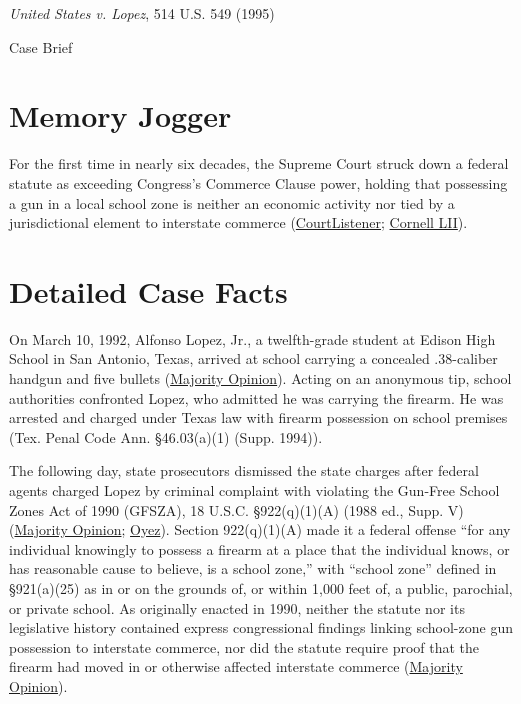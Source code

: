 \documentclass[12pt]{article}
\begin{document}
\begin{center}
{\LARGE \textit{United States v. Lopez}, 514 U.S. 549 (1995)\par}
\vspace{0.8em}
{\large Case Brief\par}
\end{center}
\vspace{1em}

\section{Memory Jogger}
For the first time in nearly six decades, the Supreme Court struck down a federal statute as exceeding Congress's Commerce Clause power, holding that possessing a gun in a local school zone is neither an economic activity nor tied by a jurisdictional element to interstate commerce (\href{https://www.courtlistener.com/opinion/117927/united-states-v-lopez/}{CourtListener}; \href{https://www.law.cornell.edu/supct/html/93-1260.ZO.html}{Cornell LII}).

\section{Detailed Case Facts}
On March 10, 1992, Alfonso Lopez, Jr., a twelfth-grade student at Edison High School in San Antonio, Texas, arrived at school carrying a concealed .38-caliber handgun and five bullets (\href{https://www.law.cornell.edu/supct/html/93-1260.ZO.html}{Majority Opinion}). Acting on an anonymous tip, school authorities confronted Lopez, who admitted he was carrying the firearm. He was arrested and charged under Texas law with firearm possession on school premises (Tex. Penal Code Ann. \S 46.03(a)(1) (Supp. 1994)).

The following day, state prosecutors dismissed the state charges after federal agents charged Lopez by criminal complaint with violating the Gun-Free School Zones Act of 1990 (GFSZA), 18 U.S.C. \S 922(q)(1)(A) (1988 ed., Supp. V) (\href{https://www.law.cornell.edu/supct/html/93-1260.ZO.html}{Majority Opinion}; \href{https://www.oyez.org/cases/1994/93-1260}{Oyez}). Section 922(q)(1)(A) made it a federal offense ``for any individual knowingly to possess a firearm at a place that the individual knows, or has reasonable cause to believe, is a school zone,'' with ``school zone'' defined in \S 921(a)(25) as in or on the grounds of, or within 1,000 feet of, a public, parochial, or private school. As originally enacted in 1990, neither the statute nor its legislative history contained express congressional findings linking school-zone gun possession to interstate commerce, nor did the statute require proof that the firearm had moved in or otherwise affected interstate commerce (\href{https://www.law.cornell.edu/supct/html/93-1260.ZO.html}{Majority Opinion}).
\end{document}
